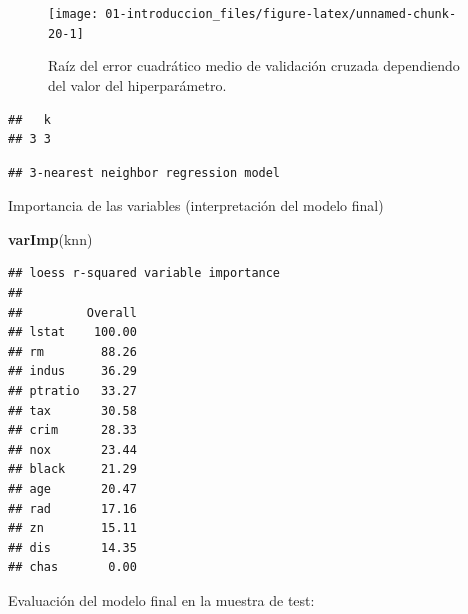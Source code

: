 \documentclass[
  spanish,
]{book}
\newenvironment{Shaded}{\begin{snugshade}}{\end{snugshade}}
\newcommand{\DataTypeTok}[1]{\textcolor[rgb]{0.13,0.29,0.53}{#1}}
\newcommand{\KeywordTok}[1]{\textcolor[rgb]{0.13,0.29,0.53}{\textbf{#1}}}
\newcommand{\NormalTok}[1]{#1}
\newcommand{\OperatorTok}[1]{\textcolor[rgb]{0.81,0.36,0.00}{\textbf{#1}}}
\theoremstyle{break}
\theoremstyle{definition}
\theoremstyle{definition}
\theoremstyle{definition}
\theoremstyle{remark}
\begin{document}
\begin{figure}[!htb]

{\centering \texttt{[image: 01-introduccion\_files/figure-latex/unnamed-chunk-20-1]} 

}

\caption{Raíz del error cuadrático medio de validación cruzada dependiendo del valor del hiperparámetro.}\label{fig:unnamed-chunk-20}
\end{figure}

\begin{Shaded}
\end{Shaded}

\begin{verbatim}
##   k
## 3 3
\end{verbatim}

\begin{Shaded}
\end{Shaded}

\begin{verbatim}
## 3-nearest neighbor regression model
\end{verbatim}

Importancia de las variables (interpretación del modelo final)

\begin{Shaded}
\begin{Highlighting}[]
\KeywordTok{varImp}\NormalTok{(knn)}
\end{Highlighting}
\end{Shaded}

\begin{verbatim}
## loess r-squared variable importance
## 
##         Overall
## lstat    100.00
## rm        88.26
## indus     36.29
## ptratio   33.27
## tax       30.58
## crim      28.33
## nox       23.44
## black     21.29
## age       20.47
## rad       17.16
## zn        15.11
## dis       14.35
## chas       0.00
\end{verbatim}

Evaluación del modelo final en la muestra de test:

\begin{Shaded}
\end{Shaded}
\end{document}

